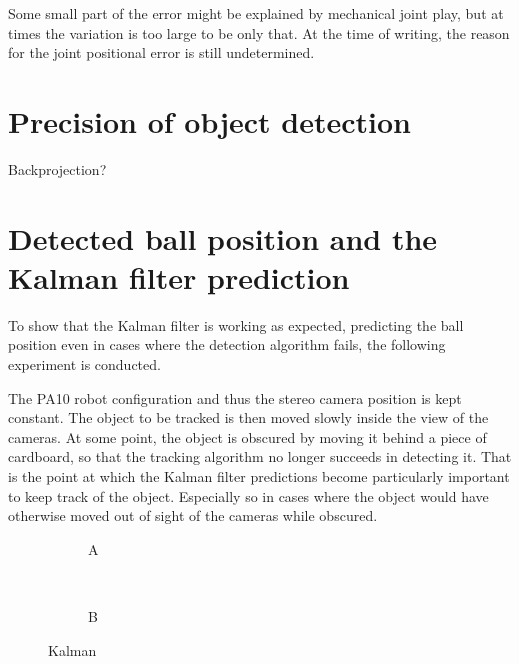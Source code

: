 Some small part of the error might be explained by mechanical joint play, but at times the variation is too large to be only that.
At the time of writing, the reason for the joint positional error is still undetermined.



\section{Precision of object detection}
Backprojection?


\section{Detected ball position and the Kalman filter prediction}
To show that the Kalman filter is working as expected,
predicting the ball position even in cases where the detection algorithm fails, the following experiment is conducted.

The PA10 robot configuration and thus the stereo camera position is kept constant.
The object to be tracked is then moved slowly inside the view of the cameras. At some point, the object is obscured by moving it behind a piece of cardboard, so that the tracking algorithm no longer succeeds in detecting it.
That is the point at which the Kalman filter predictions become particularly important to keep track of the object. Especially so in cases where the object would have otherwise moved out of sight of the cameras while obscured.



\begin{figure}
    \centering
    \begin{subfigure}[b]{0.49\textwidth}
        \resizebox{\columnwidth}{!}{%
        
        }
        \caption{A}
        \label{fig:ball_kalman_3d}
    \end{subfigure}~
    \begin{subfigure}[b]{0.49\textwidth}
        \resizebox{\columnwidth}{!}{%
            
        }
        \caption{B}
        \label{fig:ball_kalman_error}
    \end{subfigure}
    \caption{Kalman}
    \label{fig:kalman_test}
\end{figure}


